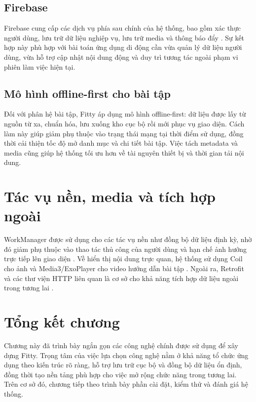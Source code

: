 \subsection{Firebase}

Firebase cung cấp các dịch vụ phía sau chính của hệ thống, bao gồm xác thực người dùng, lưu trữ dữ liệu nghiệp vụ, lưu trữ media và thông báo đẩy \cite{firebase_setup,firebase_auth,firebase_firestore,firebase_storage,firebase_fcm}. Sự kết hợp này phù hợp với bài toán ứng dụng di động cần vừa quản lý dữ liệu người dùng, vừa hỗ trợ cập nhật nội dung động và duy trì tương tác ngoài phạm vi phiên làm việc hiện tại.

\subsection{Mô hình offline-first cho bài tập}

Đối với phân hệ bài tập, Fitty áp dụng mô hình offline-first: dữ liệu được lấy từ nguồn từ xa, chuẩn hóa, lưu xuống kho cục bộ rồi mới phục vụ giao diện. Cách làm này giúp giảm phụ thuộc vào trạng thái mạng tại thời điểm sử dụng, đồng thời cải thiện tốc độ mở danh mục và chi tiết bài tập. Việc tách metadata và media cũng giúp hệ thống tối ưu hơn về tài nguyên thiết bị và thời gian tải nội dung.

\section{Tác vụ nền, media và tích hợp ngoài}

WorkManager được sử dụng cho các tác vụ nền như đồng bộ dữ liệu định kỳ, nhờ đó giảm phụ thuộc vào thao tác thủ công của người dùng và hạn chế ảnh hưởng trực tiếp lên giao diện \cite{android_background_tasks,android_workmanager}. Về hiển thị nội dung trực quan, hệ thống sử dụng Coil cho ảnh và Media3/ExoPlayer cho video hướng dẫn bài tập \cite{android_media3}. Ngoài ra, Retrofit và các thư viện HTTP liên quan là cơ sở cho khả năng tích hợp dữ liệu ngoài trong tương lai \cite{retrofit_intro,retrofit_declarations}.

\section{Tổng kết chương}

Chương này đã trình bày ngắn gọn các công nghệ chính được sử dụng để xây dựng Fitty. Trọng tâm của việc lựa chọn công nghệ nằm ở khả năng tổ chức ứng dụng theo kiến trúc rõ ràng, hỗ trợ lưu trữ cục bộ và đồng bộ dữ liệu ổn định, đồng thời tạo nền tảng phù hợp cho việc mở rộng chức năng trong tương lai. Trên cơ sở đó, chương tiếp theo trình bày phần cài đặt, kiểm thử và đánh giá hệ thống.
